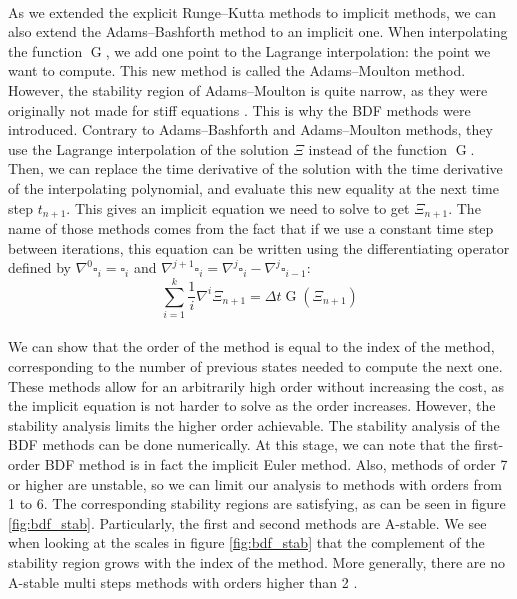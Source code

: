         \paragraph{}
        As we extended the explicit Runge--Kutta methods to implicit methods, we can also extend the Adams--Bashforth method to an implicit one.
        When interpolating the function $\operatorname{G}$, we add one point to the Lagrange interpolation: the point we want to compute.
        This new method is called the Adams--Moulton method.
        However, the stability region of Adams--Moulton is quite narrow, as they were originally not made for stiff equations \cite{Iserles2008}.
        This is why the BDF methods were introduced.
        Contrary to Adams--Bashforth and Adams--Moulton methods, they use the Lagrange interpolation of the solution $\Xi$ instead of the function $\operatorname{G}$.
        Then, we can replace the time derivative of the solution with the time derivative of the interpolating polynomial, and evaluate this new equality at the next time step $t_{n+1}$.
        This gives an implicit equation we need to solve to get $\Xi_{n+1}$.
        The name of those methods comes from the fact that if we use a constant time step between iterations, this equation can be written using the differentiating operator defined by $\nabla^0 \square_i = \square_i$ and $\nabla^{j+1} \square_i = \nabla^j \square_i - \nabla^j \square_{i-1}$:
        \begin{equation}
          \sum_{i=1}^k \frac{1}{i} \nabla^i \Xi_{n+1} = \Delta t \operatorname{G}\left(\Xi_{n+1}\right)
        \end{equation}

        \paragraph{}
        We can show that the order of the method is equal to the index of the method, corresponding to the number of previous states needed to compute the next one.
        These methods allow for an arbitrarily high order without increasing the cost, as the implicit equation is not harder to solve as the order increases.
        However, the stability analysis limits the higher order achievable.
        The stability analysis of the BDF methods can be done numerically.
        At this stage, we can note that the first-order BDF method is in fact the implicit Euler method.
        Also, methods of order 7 or higher are unstable, so we can limit our analysis to methods with orders from 1 to 6.
        The corresponding stability regions are satisfying, as can be seen in figure \ref{fig:bdf_stab}.
        Particularly, the first and second methods are A-stable.
        We see when looking at the scales in figure \ref{fig:bdf_stab} that the complement of the stability region grows with the index of the method.
        More generally, there are no A-stable multi steps methods with orders higher than 2 \cite{Dahlquist1963, HairerWanner1996}.

